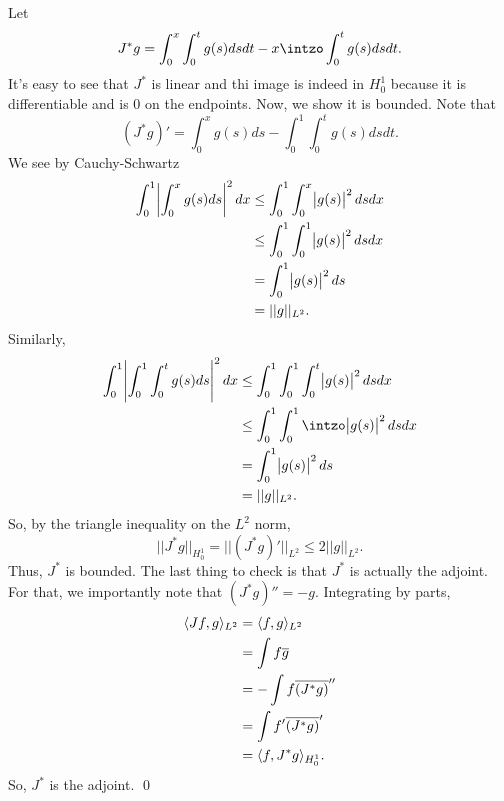 \documentclass{article}
\begin{document}
\newpage
{} 
 \tri
\hop 
\solution
Let 
\[J^*g = \int_0^x\int_0^t g(s)dsdt - x\intzo\int_0^t g(s)ds dt. \]
It's easy to see that $J^*$ is linear and thi image is indeed in $H_0^1$ because it is differentiable and is 0 on the endpoints. Now, we show it is bounded. Note that 
\[(J^*g)' = \int_0^x g(s) ds - \int_0^1 \int_0^t g(s)ds dt.\]
We see by Cauchy-Schwartz
\begin{align*}
    \int_0^1 \abs{\int_0^x g(s) ds}^2dx &\le  \int_0^1 \int_0^x \abs{g(s)}^2 dsdx\\
    &\le  \int_0^1 \int_0^1 \abs{g(s)}^2 dsdx\\
    &= \int_0^1 \abs{g(s)}^2 ds\\
    &= ||g||_{L^2}.
\end{align*}
Similarly,
\begin{align*}
    \int_0^1 \abs{\int_0^1 \int_0^t g(s) ds}^2dx &\le  \int_0^1 \int_0^1 \int_0^t \abs{g(s)}^2 dsdx\\
    &\le  \int_0^1 \int_0^1 \intzo \abs{g(s)}^2 dsdx\\
    &= \int_0^1 \abs{g(s)}^2 ds\\
    &= ||g||_{L^2}.
\end{align*}
So, by the triangle inequality on the $L^2$ norm, 
\[||J^*g||_{H_0^1} = ||(J^*g)'||_{L^2} \le 2||g||_{L^2}. \]
Thus, $J^*$ is bounded. The last thing to check is that $J^*$ is actually the adjoint. For that, we importantly note that $(J^*g)'' = -g$. Integrating by parts,
\begin{align*}
    \langle Jf, g\rangle_{L^2} &=  \langle f, g\rangle_{L^2} \\
    &= \int f{\overline{g}} \\
    &= -\int f{\overline{(J^*g)}}''\\
    &= \int f'{\overline{(J^*g)}}' \\
    &= \langle f, J^* g\rangle_{H_0^1}.
\end{align*}
So, $J^*$ is the adjoint. \qed
\newpage
{} 
 \tri
\hop 
\solution
\end{document}
